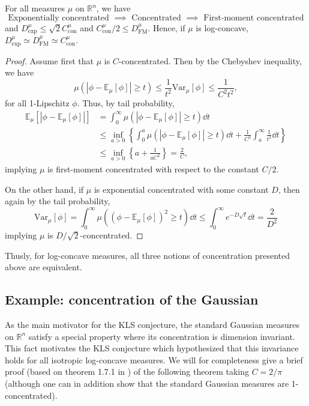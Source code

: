 \begin{proposition}\label{thm:equiv}
  For all measures \(\mu\) on \(\mathbb{R}^n\), we have 
  \[\text{Exponentially concentrated \(\implies\) Concentrated \(\implies\) First-moment concentrated}\]
  and \(D^\mu_{\text{exp}} \le \sqrt{2} C^\mu_{\text{con}}\) and 
  \(C^\mu_{\text{con}} / 2 \le D^\mu_{\text{FM}}\).
  Hence, if \(\mu\) is log-concave, 
  \(D^\mu_{\text{exp}} \simeq D^\mu_{\text{FM}} \simeq C^\mu_{\text{con}}\).
\end{proposition}
\begin{proof}
  Assume first that \(\mu\) is \(C\)-concentrated. Then by the Chebyshev inequality, we have 
  \[\mu(|\phi - \mathbb{E}_\mu[\phi]| \ge t) 
      \le \frac{1}{t^2}\text{Var}_\mu[\phi] 
      \le \frac{1}{C^2t^2},\]
  for all 1-Lipschitz \(\phi\). 
  Thus, by tail probability,
  \begin{align*}\mathbb{E}_\mu[|\phi - \mathbb{E}_\mu[\phi]|] 
    & = \int_0^\infty \mu(|\phi - \mathbb{E}_\mu[\phi]| \ge t) \dd t\\ 
    & \le \inf_{a > 0} \left\{\int_0^a \mu(|\phi - \mathbb{E}_\mu[\phi]| \ge t) \dd t + \frac{1}{C^2} \int_a^\infty \frac{1}{t^2} \dd t\right\}\\ 
    & \le \inf_{a > 0} \left\{a + \frac{1}{aC^2}\right\} = \frac{2}{C},
  \end{align*}
  implying \(\mu\) is first-moment concentrated with respect to the constant \(C / 2\).

  On the other hand, if \(\mu\) is exponential concentrated with some constant \(D\), then 
  again by the tail probability, 
  \[\text{Var}_\mu[\phi] = \int_0^\infty \mu((\phi - \mathbb{E}_\mu[\phi])^2 \ge t) \dd t
      \le \int_0^\infty e^{-D \sqrt{t}} \dd t = \frac{2}{D^2}\]
  implying \(\mu\) is \(D / \sqrt{2}\)-concentrated.
\end{proof}

Thusly, for log-concave measures, all three notions of concentration presented above are equivalent.

\subsection{Example: concentration of the Gaussian}\label{sec:gaussian_conc}

As the main motivator for the KLS conjecture, the standard Gaussian measures on \(\mathbb{R}^n\) satisfy 
a special property where its concentration is dimension invariant.
This fact motivates the KLS conjecture which hypothesized that 
this invariance holds for all isotropic log-concave measures. We will 
for completeness give a brief proof (based on theorem 1.7.1 in \cite{Bogachev_1998}) of the following 
theorem taking \(C = 2 / \pi\) (although one can in addition show that the standard Gaussian measures are 1-concentrated).

